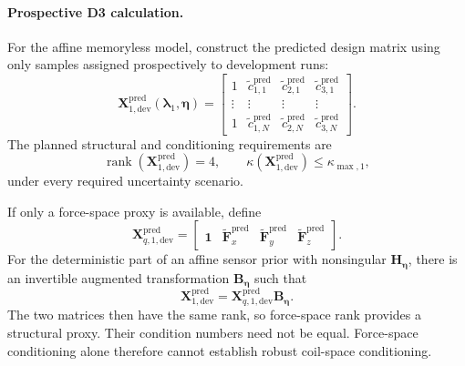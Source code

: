 \documentclass[11pt,a4paper]{article}
\begin{document}
\paragraph{Prospective D3 calculation.}
For the affine memoryless model, construct the predicted design matrix using
only samples assigned prospectively to development runs:
\begin{equation}
    \mathbf{X}_{1,\mathrm{dev}}^{\mathrm{pred}}
    \left(
        \boldsymbol{\lambda}_1,
        \boldsymbol{\eta}
    \right)
    =
    \begin{bmatrix}
        1 &
        \widetilde{c}^{\mathrm{pred}}_{1,1} &
        \widetilde{c}^{\mathrm{pred}}_{2,1} &
        \widetilde{c}^{\mathrm{pred}}_{3,1}\\
        \vdots & \vdots & \vdots & \vdots\\
        1 &
        \widetilde{c}^{\mathrm{pred}}_{1,N} &
        \widetilde{c}^{\mathrm{pred}}_{2,N} &
        \widetilde{c}^{\mathrm{pred}}_{3,N}
    \end{bmatrix}.
\end{equation}
The planned structural and conditioning requirements are
\begin{equation}
    \operatorname{rank}
    \left(
        \mathbf{X}_{1,\mathrm{dev}}^{\mathrm{pred}}
    \right)
    =4,
    \qquad
    \kappa
    \left(
        \mathbf{X}_{1,\mathrm{dev}}^{\mathrm{pred}}
    \right)
    \leq
    \kappa_{\max,1},
\end{equation}
under every required uncertainty scenario.

If only a force-space proxy is available, define
\begin{equation}
    \mathbf{X}_{q,1,\mathrm{dev}}^{\mathrm{pred}}
    =
    \begin{bmatrix}
        \mathbf{1} &
        \widetilde{\mathbf{F}}^{\mathrm{pred}}_{x} &
        \widetilde{\mathbf{F}}^{\mathrm{pred}}_{y} &
        \widetilde{\mathbf{F}}^{\mathrm{pred}}_{z}
    \end{bmatrix}.
\end{equation}
For the deterministic part of an affine sensor prior with nonsingular
$\mathbf{H}_{\boldsymbol{\eta}}$, there is an invertible augmented
transformation $\mathbf{B}_{\boldsymbol{\eta}}$ such that
\begin{equation}
    \mathbf{X}_{1,\mathrm{dev}}^{\mathrm{pred}}
    =
    \mathbf{X}_{q,1,\mathrm{dev}}^{\mathrm{pred}}
    \mathbf{B}_{\boldsymbol{\eta}}.
\end{equation}
The two matrices then have the same rank, so force-space rank provides a
structural proxy. Their condition numbers need not be equal. Force-space
conditioning alone therefore cannot establish robust coil-space
conditioning.
\end{document}
